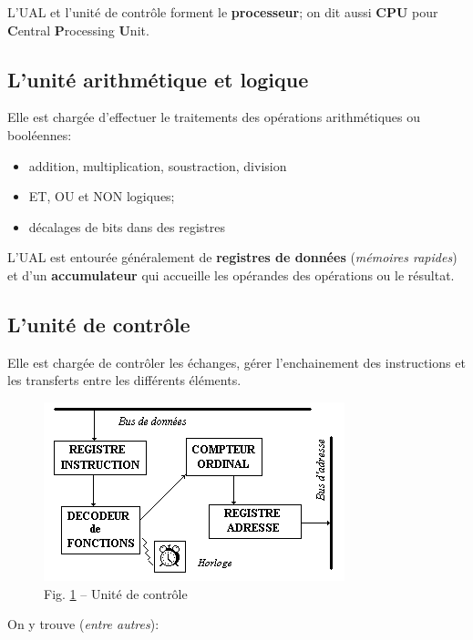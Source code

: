 \documentclass[11pt,french]{article}
\makeatletter
\def\maxwidth{\ifdim\Gin@nat@width>\linewidth\linewidth
    \else\Gin@nat@width\fi}
\let\Oldincludegraphics\includegraphics
\renewcommand{\includegraphics}[1]{\Oldincludegraphics[width=.8\maxwidth]{#1}}
\providecommand{\tightlist}{%
      \setlength{\itemsep}{0pt}\setlength{\parskip}{0pt}}
\makeatother
\begin{document}
L'UAL et l'unité de contrôle forment le \textbf{processeur}; on dit aussi \textbf{CPU} pour \textbf{C}entral
\textbf{P}rocessing \textbf{U}nit.

\hypertarget{uniteAL}{%
\subsection{L'unité arithmétique et logique}\label{uniteAL}}

 Elle est chargée d'effectuer le traitements des opérations   arithmétiques ou booléennes:
\begin{itemize}
\tightlist
\item addition, multiplication, soustraction, division
\item ET, OU et NON logiques;
\item décalages de bits dans des registres
\end{itemize}

L'UAL est entourée généralement de \textbf{registres de données}
(\textit{mémoires rapides}) et d'un \textbf{accumulateur} qui accueille les opérandes des
opérations ou le résultat.

\hypertarget{unitcontrol}{%
\subsection{L'unité de contrôle}\label{unitcontrol}}

  Elle est chargée de contrôler les échanges, gérer l'enchainement des
  instructions et les transferts entre les différents éléments.
\begin{figure}[h]
	\begin{center}  
  		\includegraphics{../img/control_unit.png} 
	\end{center}
	\caption{Fig. \ref{fig:controlunit} -- Unité de contrôle}
	\label{fig:controlunit}
\end{figure}

On y trouve (\textit{entre autres}):
\end{document}
